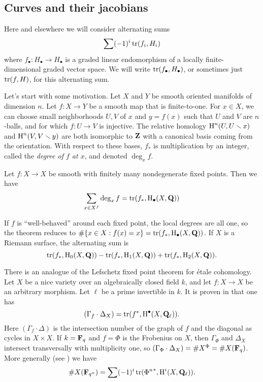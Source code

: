 \subsection{Curves and their jacobians} %

Here and elsewhere we will consider alternating sums 
\[
  \sum (-1)^i \operatorname{tr}(f_i,H_i)
\]
where $f_\bullet:H_\bullet \to H_\bullet$ is a graded linear endomorphism of a 
locally finite-dimensional graded vector space. We will write 
$\operatorname{tr}(f_\bullet,H_\bullet)$, or sometimes just $\operatorname{tr}(f,H)$, for this 
alternating sum. 

Let's start with some motivation. Let $X$ and $Y$ be smooth oriented manifolds 
of dimension $n$. Let $f:X\to Y$ be a smooth map that is finite-to-one. For 
$x\in X$, we can choose small neighborhoods $U,V$ of $x$ and $y=f(x)$ such 
that $U$ and $V$ are $n$-balls, and for which $f:U\to V$ is injective. 
The relative homology $\operatorname{H}^n(U,U\smallsetminus x)$ and $\operatorname{H}^n(V,V\smallsetminus y)$ are 
both isomorphic to $\mathbf{Z}$ with a canonical basis coming from the orientation. 
With respect to these bases, $f_\ast$ is multiplication by an integer, called 
the \emph{degree of $f$ at $x$}, and denoted $\deg_x f$. 

\begin{theorem}[Lefschetz]
Let $f:X\to X$ be smooth with finitely many nondegenerate fixed points. Then 
we have 
\[
  \sum_{x\in X^f} \deg_x f = \operatorname{tr}(f_\ast,\operatorname{H}_\bullet(X,\mathbf{Q}))
\]
\end{theorem}
If $f$ is ``well-behaved'' around each fixed point, the local degrees are all 
one, so the theorem reduces to $\# \{x\in X:f(x)=x\}=\operatorname{tr}(f_\ast,\operatorname{H}_\bullet(X,\mathbf{Q}))$. If 
$X$ is a Riemann surface, the alternating sum is 
\[
  \operatorname{tr}(f_\ast,\operatorname{H}_0(X,\mathbf{Q})) - \operatorname{tr}(f_\ast,\operatorname{H}_1(X,\mathbf{Q})) + \operatorname{tr}(f_\ast,\operatorname{H}_2(X,\mathbf{Q}))\text{.}
\]

There is an analogue of the Lefschetz fixed point theorem for \'etale 
cohomology. Let $X$ be a nice variety over an algebraically closed field $k$, 
and let $f:X\to X$ be an arbitrary morphism. Let $\ell$ be a prime invertible 
in $k$. It is proven in \cite[IV.3.3]{de77} that one has 
\[
  (\Gamma_f \cdot \Delta_X) = \operatorname{tr}(f^\ast,\operatorname{H}^\bullet(X,\mathbf{Q}_\ell))\text{.}
\]
Here $(\Gamma_f\cdot \Delta)$ is the intersection number of the graph of $f$ 
and the diagonal as cycles in $X\times X$. If $k=\mathbf{F}_q$ and $f=\Phi$ is the 
Frobenius on $X$, then $\Gamma_\Phi$ and $\Delta_X$ intersect transversally 
with multiplicity one, so 
$(\Gamma_\Phi\cdot \Delta_X)=\# X^\Phi=\# X(\mathbf{F}_q)$. More generally (see 
\cite[IV.3.7]{de77}) we have
\[
  \# X(\mathbf{F}_{q^n}) = \sum (-1)^i \operatorname{tr}({\Phi^n}^\ast, \operatorname{H}^i(X,\mathbf{Q}_\ell)) \text{.}
\]

